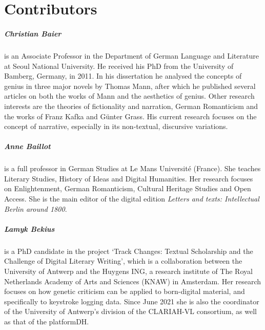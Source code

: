 \pagestyle{authors}
\chapter*{Contributors}
\protect\thispagestyle{chaptertitlepage}


\paragraph{Christian Baier} is an Associate Professor in the Department of German
Language and Literature at Seoul National University. He received his
PhD from the University of Bamberg, Germany, in 2011. In his
dissertation he analysed the concepts of genius in three major novels by
Thomas Mann, after which he published several articles on both the works
of Mann and the aesthetics of genius. Other research interests are the
theories of fictionality and narration, German Romanticism and the works
of Franz Kafka and Günter Grass. His current research focuses on the
concept of narrative, especially in its non-textual, discursive
variations.

\paragraph{Anne Baillot} is a full professor in German Studies at Le Mans Université (France). She teaches Literary Studies, History of Ideas and Digital Humanities. Her research focuses on Enlightenment, German Romanticism, Cultural Heritage Studies and Open Access. She is the main editor of the digital edition \emph{Letters and texts: Intellectual Berlin around 1800}.

\paragraph{Lamyk Bekius} is a PhD candidate in the project ‘Track Changes: Textual Scholarship and the Challenge of Digital Literary Writing’, which is a collaboration between the University of Antwerp and the Huygens ING, a research institute of The Royal Netherlands Academy of Arts and Sciences (KNAW) in Amsterdam. Her research focuses on how genetic criticism can be applied to born-digital material, and specifically to keystroke logging data. Since June 2021 she is also the coordinator of the University of Antwerp’s division of the CLARIAH-VL consortium, as well as that of the platform{DH}.

